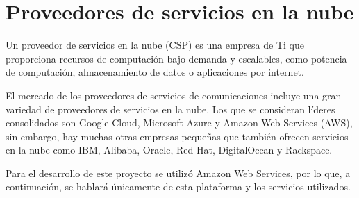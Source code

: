 \section{Proveedores de servicios en la nube}
Un proveedor de servicios en la nube (CSP) es una empresa de Ti que proporciona recursos de computación bajo demanda y escalables, como potencia de computación, almacenamiento de datos o aplicaciones por internet.

El mercado de los proveedores de servicios de comunicaciones incluye una gran variedad de proveedores de servicios en la nube. Los que se consideran líderes consolidados son Google Cloud, Microsoft Azure y Amazon Web Services (AWS), sin embargo, hay muchas otras empresas pequeñas que también ofrecen servicios en la nube como IBM, Alibaba, Oracle, Red Hat, DigitalOcean y Rackspace. 

Para el desarrollo de este proyecto se utilizó Amazon Web Services, por lo que, a continuación, se hablará únicamente de esta plataforma y los servicios utilizados.
    